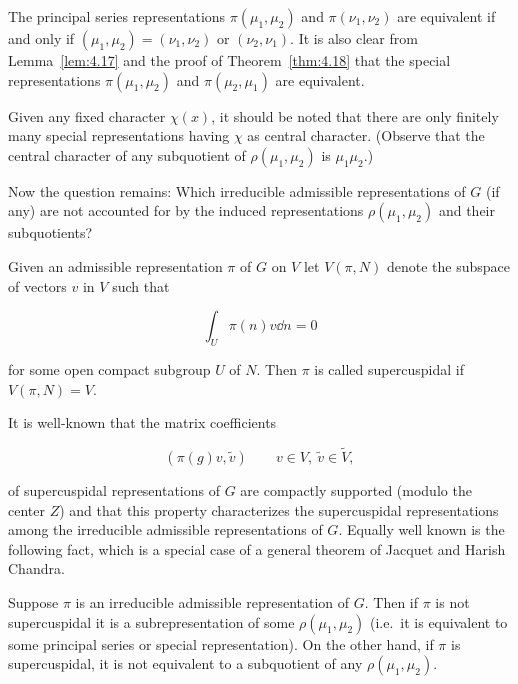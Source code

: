 \begin{remark}\label{rem:4.19}

The principal series representations $\pi(\mu_1, \mu_2)$ and $\pi(\nu_1, \nu_2)$ are equivalent if and only if $(\mu_1, \mu_2) = (\nu_1, \nu_2)$ or $(\nu_2, \nu_1)$. It is also clear from Lemma~\ref{lem:4.17} and the proof of Theorem~\ref{thm:4.18} that the special representations $\pi(\mu_1, \mu_2)$ and $\pi(\mu_2, \mu_1)$ are equivalent.

Given any fixed character $\chi(x)$, it should be noted that there are only finitely many special representations having $\chi$ as central character. (Observe that the central character of any subquotient of $\rho(\mu_1, \mu_2)$ is $\mu_1\mu_2$.)

Now the question remains: Which irreducible admissible representations of $G$ (if any) are not accounted for by the induced representations $\rho(\mu_1, \mu_2)$ and their subquotients?

\end{remark}

\begin{definition}\label{def:4.20}

Given an admissible representation $\pi$ of $G$ on $V$ let $V(\pi, N)$ denote the subspace of vectors $v$ in $V$ such that

\begin{equation}\label{eq:4.15}
\int_U \pi(n)v\dd n = 0\tag{4.15}
\end{equation}

for some open compact subgroup $U$ of $N$. Then $\pi$ is called supercuspidal if $V(\pi, N) = V$.

\end{definition}

It is well-known that the matrix coefficients

\[
(\pi(g)v, \tilde{v}) \qquad v \in V, \ \tilde{v} \in \tilde{V},
\]

of supercuspidal representations of $G$ are compactly supported (modulo the center $Z$) and that this property characterizes the supercuspidal representations among the irreducible admissible representations of $G$. Equally well known is the following fact, which is a special case of a general theorem of Jacquet and Harish Chandra.

\begin{theorem}\label{thm:4.21}

Suppose $\pi$ is an irreducible admissible representation of $G$. Then if $\pi$ is not supercuspidal it is a subrepresentation of some $\rho(\mu_1, \mu_2)$ (i.e.\ it is equivalent to some principal series or special representation). On the other hand, if $\pi$ is supercuspidal, it is not equivalent to a subquotient of any $\rho(\mu_1, \mu_2)$.

\end{theorem}

